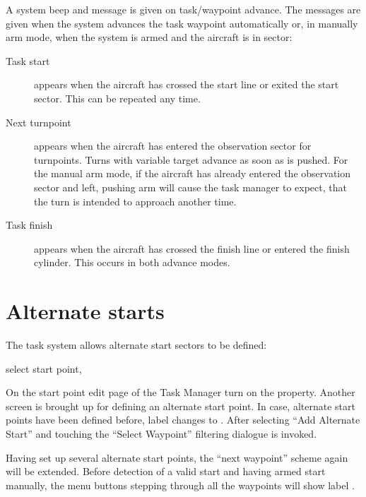 A system beep and message is given on task/waypoint advance.  The
messages are given when the system advances the task waypoint
automatically or, in manually arm mode, when the system is armed and the
aircraft is in sector:
\begin{description}
\item[Task start]  appears when the aircraft has crossed the start line or
 exited the start sector. This can be repeated any time.
\item[Next turnpoint]  appears when the aircraft has entered the observation
 sector for turnpoints. Turns with variable target advance as soon as
  is pushed.  For the manual arm mode, if the
 aircraft has already entered the observation sector and left, pushing arm will
 cause the task manager to expect, that the turn is intended to approach
 another time.
\item[Task finish]  appears when the aircraft has crossed the finish line
 or entered the finish cylinder.  This occurs in both advance modes.
\end{description}


\section{Alternate starts}\label{sec:alternate-starts}



The task system allows alternate start sectors to be defined:

\blink{} select start point, \blink{}

On the start point edit page of the Task Manager turn on the  property. Another screen is brought up for defining an
alternate start point. In case, alternate start points have been defined before, label  changes to . After selecting ``Add Alternate Start'' and touching
 the ``Select Waypoint'' filtering dialogue is invoked.

Having set up several alternate start points, the ``next waypoint'' scheme again will be extended. Before detection of a valid start and having armed start manually, the menu buttons stepping through all the waypoints will show label .

